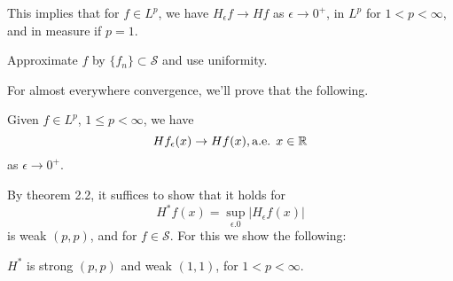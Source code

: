 This implies that for $f\in L^p$, we have $H_\epsilon f\to Hf$ as $\epsilon\to 0^+$, in $L^p$ for $1<p<\infty$, and in measure if $p=1$.

\begin{exercise}
    Approximate $f$ by $\{f_n\}\subset\mathcal{S}$ and use uniformity.
\end{exercise}
For almost everywhere convergence, we'll prove that the following.
\begin{theorem}
    Given $f\in L^p$, $1\leq p<\infty$, we have
    \begin{equation*}
        Hf_\epsilon(x)\to Hf(x), \text{a.e. } x\in\mathbb{R}
    \end{equation*}
    as $\epsilon\to 0^+$.
\end{theorem}

By theorem 2.2, it suffices to show that it holds for 
\begin{equation*}
    H^*f(x)=\sup_{\epsilon.0}|H_\epsilon f(x)|
\end{equation*}
is weak $(p,p)$, and for $f\in\mathcal{S}$. For this we show the following:
\begin{theorem}
    $H^*$ is strong $(p,p)$ and weak $(1,1)$, for $1<p<\infty$.
\end{theorem}

